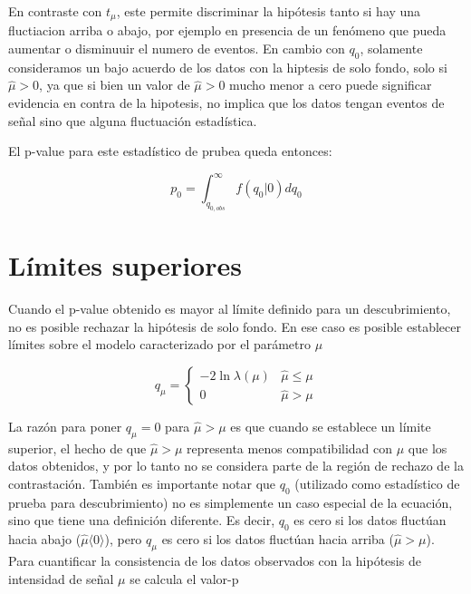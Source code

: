 En contraste con $t_{\mu}$, este permite discriminar la hipótesis tanto si hay una fluctiacion arriba o abajo, por ejemplo en presencia de un fenómeno que pueda aumentar o disminuuir el numero de eventos. En cambio con $q_{0}$, solamente consideramos un bajo acuerdo de los datos con la hiptesis de solo fondo, solo si $\hat{\mu}>0$, ya que si bien un valor de $\hat{\mu}>0$ mucho menor a cero puede significar evidencia en contra de la hipotesis, no implica que los datos tengan eventos de señal sino que alguna fluctuación estadística.


El p-value para este estadístico de prubea queda entonces:

\begin{equation}
	p_0 = \int_{q_{0, obs}}^{\infty} f(q_0|0)dq_0
\end{equation}


\section{Límites superiores}

Cuando el p-value obtenido es mayor al límite definido para un descubrimiento, no es posible rechazar la hipótesis de solo fondo. En ese caso es posible establecer límites sobre el modelo caracterizado por el parámetro $\mu$

\begin{equation}
	q_{\mu}=
	\begin{cases}
		-2\ln{\lambda(\mu)} & \hat{\mu}\le\mu\\
		0 & \hat{\mu}>\mu
	\end{cases}
\end{equation}


La razón para poner $q_{\mu} = 0$ para $\hat{\mu}>\mu$ es que cuando se establece un límite superior, el hecho
de que $\hat{\mu}>\mu$ representa menos compatibilidad con $\mu$ que los datos obtenidos, y por lo tanto no se
considera parte de la región de rechazo de la contrastación.
También es importante notar que $q_0$ (utilizado como estadístico de prueba para descubrimiento) no
es simplemente un caso especial de la ecuación, sino que tiene una definición diferente. Es decir,
$q_0$ es cero si los datos fluctúan hacia abajo ($\hat{\mu}\langle 0\rangle$), pero $q_{\mu}$ es cero si los datos fluctúan hacia arriba
($\hat{\mu}>\mu$).
Para cuantificar la consistencia de los datos observados con la hipótesis de intensidad de señal $\mu$ se
calcula el valor-p


